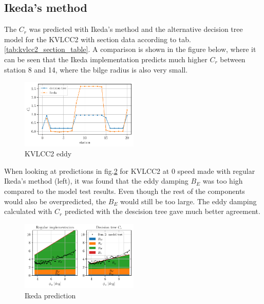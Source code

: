     \subsection{Ikeda's method}\label{ikedas-method}

    The $C_r$ was predicted with Ikeda's method and the alternative
decision tree model for the KVLCC2 with section data according to
tab.\ref{tab:kvlcc2_section_table}. A comparison is shown in the
figure below, where it can be seen that the Ikeda implementation
predicts much higher $C_r$ between station 8 and 14, where the bilge
radius is also very small.

    \begin{figure}[H]
        \begin{center}\includegraphics[width = 0.5\textwidth]{figures/kvlcc2_eddy.pdf}\end{center}
        \vspace{-1cm}
        \caption{KVLCC2 eddy}
        \label{fig:kvlcc2_eddy}
    \end{figure}
    
    When looking at predictions in fig.\ref{fig:ikeda} for KVLCC2 at
0 speed made with regular Ikeda's method (left), it was found that the
eddy damping $B_E$ was too high compared to the model test results.
Even though the rest of the components would also be overpredicted, the
$B_E$ would still be too large. The eddy damping calculated with
$C_r$ predicted with the descision tree gave much better agreement.

    

    \begin{figure}[H]
        \begin{center}\includegraphics[width = 0.5\textwidth]{figures/ikeda.pdf}\end{center}
        \vspace{-1cm}
        \caption{Ikeda prediction}
        \label{fig:ikeda}
    \end{figure}
    
